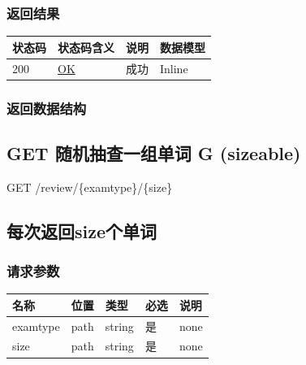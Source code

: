 \documentclass[
]{article}
\begin{document}
\hypertarget{ux8fd4ux56deux7ed3ux679c-14}{%
\subsubsection{返回结果}\label{ux8fd4ux56deux7ed3ux679c-14}}

\begin{longtable}[]{@{}llll@{}}
\toprule
状态码 & 状态码含义 & 说明 & 数据模型 \\
\midrule
\endhead
200 & \href{https://tools.ietf.org/html/rfc7231\#section-6.3.1}{OK} &
成功 & Inline \\
\bottomrule
\end{longtable}

\hypertarget{ux8fd4ux56deux6570ux636eux7ed3ux6784-11}{%
\subsubsection{返回数据结构}\label{ux8fd4ux56deux6570ux636eux7ed3ux6784-11}}

\hypertarget{get-ux968fux673aux62bdux67e5ux4e00ux7ec4ux5355ux8bcd-g-sizeable}{%
\subsection{GET 随机抽查一组单词 G
(sizeable)}\label{get-ux968fux673aux62bdux67e5ux4e00ux7ec4ux5355ux8bcd-g-sizeable}}

GET /review/\{examtype\}/\{size\}

\hypertarget{ux6bcfux6b21ux8fd4ux56desizeux4e2aux5355ux8bcd}{%
\subsection{每次返回size个单词}\label{ux6bcfux6b21ux8fd4ux56desizeux4e2aux5355ux8bcd}}

\hypertarget{ux8bf7ux6c42ux53c2ux6570-15}{%
\subsubsection{请求参数}\label{ux8bf7ux6c42ux53c2ux6570-15}}

\begin{longtable}[]{@{}lllll@{}}
\toprule
名称 & 位置 & 类型 & 必选 & 说明 \\
\midrule
\endhead
examtype & path & string & 是 & none \\
size & path & string & 是 & none \\
\bottomrule
\end{longtable}
\end{document}
